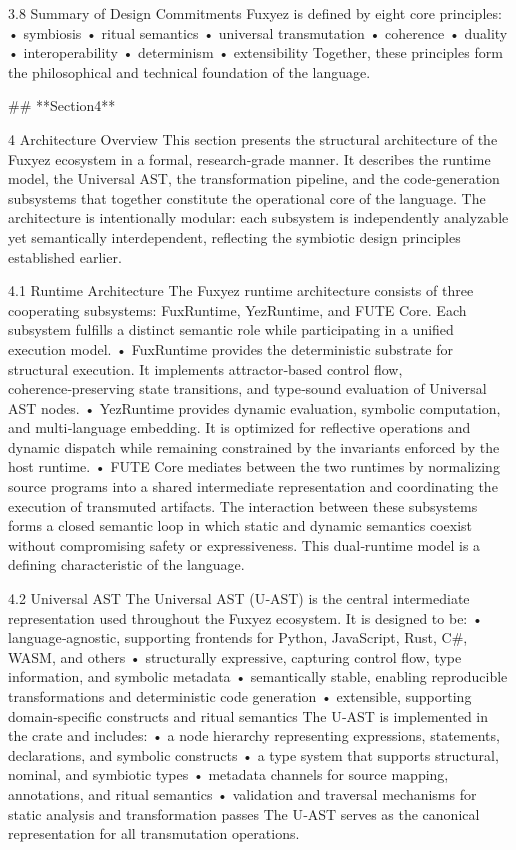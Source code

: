 3.8 Summary of Design Commitments
Fuxyez is defined by eight core principles:
• 	symbiosis
• 	ritual semantics
• 	universal transmutation
• 	coherence
• 	duality
• 	interoperability
• 	determinism
• 	extensibility
Together, these principles form the philosophical and technical foundation of the language.

## **Section4**

4 Architecture Overview
This section presents the structural architecture of the Fuxyez ecosystem in a formal, research‑grade manner. It describes the runtime model, the Universal AST, the transformation pipeline, and the code‑generation subsystems that together constitute the operational core of the language. The architecture is intentionally modular: each subsystem is independently analyzable yet semantically interdependent, reflecting the symbiotic design principles established earlier.

4.1 Runtime Architecture
The Fuxyez runtime architecture consists of three cooperating subsystems: FuxRuntime, YezRuntime, and FUTE Core. Each subsystem fulfills a distinct semantic role while participating in a unified execution model.
• 	FuxRuntime provides the deterministic substrate for structural execution. It implements attractor‑based control flow, coherence‑preserving state transitions, and type‑sound evaluation of Universal AST nodes.
• 	YezRuntime provides dynamic evaluation, symbolic computation, and multi‑language embedding. It is optimized for reflective operations and dynamic dispatch while remaining constrained by the invariants enforced by the host runtime.
• 	FUTE Core mediates between the two runtimes by normalizing source programs into a shared intermediate representation and coordinating the execution of transmuted artifacts.
The interaction between these subsystems forms a closed semantic loop in which static and dynamic semantics coexist without compromising safety or expressiveness. This dual‑runtime model is a defining characteristic of the language.

4.2 Universal AST
The Universal AST (U‑AST) is the central intermediate representation used throughout the Fuxyez ecosystem. It is designed to be:
• 	language‑agnostic, supporting frontends for Python, JavaScript, Rust, C#, WASM, and others
• 	structurally expressive, capturing control flow, type information, and symbolic metadata
• 	semantically stable, enabling reproducible transformations and deterministic code generation
• 	extensible, supporting domain‑specific constructs and ritual semantics
The U‑AST is implemented in the  crate and includes:
• 	a node hierarchy representing expressions, statements, declarations, and symbolic constructs
• 	a type system that supports structural, nominal, and symbiotic types
• 	metadata channels for source mapping, annotations, and ritual semantics
• 	validation and traversal mechanisms for static analysis and transformation passes
The U‑AST serves as the canonical representation for all transmutation operations.

